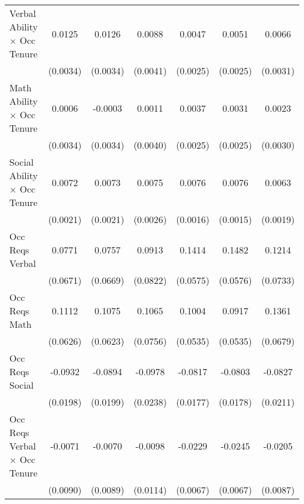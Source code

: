 {\begin{longtable}{l*{6}{c}}
Verbal Ability $\times$ Occ Tenure&      0.0125\sym{***}&      0.0126\sym{***}&      0.0088\sym{**} &      0.0047\sym{*}  &      0.0051\sym{**} &      0.0066\sym{**} \\
                    &    (0.0034)         &    (0.0034)         &    (0.0041)         &    (0.0025)         &    (0.0025)         &    (0.0031)         \\
Math Ability $\times$ Occ Tenure&      0.0006         &     -0.0003         &      0.0011         &      0.0037         &      0.0031         &      0.0023         \\
                    &    (0.0034)         &    (0.0034)         &    (0.0040)         &    (0.0025)         &    (0.0025)         &    (0.0030)         \\
Social Ability $\times$ Occ Tenure&      0.0072\sym{***}&      0.0073\sym{***}&      0.0075\sym{***}&      0.0076\sym{***}&      0.0076\sym{***}&      0.0063\sym{***}\\
                    &    (0.0021)         &    (0.0021)         &    (0.0026)         &    (0.0016)         &    (0.0015)         &    (0.0019)         \\
Occ Reqs Verbal     &      0.0771         &      0.0757         &      0.0913         &      0.1414\sym{**} &      0.1482\sym{**} &      0.1214\sym{*}  \\
                    &    (0.0671)         &    (0.0669)         &    (0.0822)         &    (0.0575)         &    (0.0576)         &    (0.0733)         \\
Occ Reqs Math       &      0.1112\sym{*}  &      0.1075\sym{*}  &      0.1065         &      0.1004\sym{*}  &      0.0917\sym{*}  &      0.1361\sym{**} \\
                    &    (0.0626)         &    (0.0623)         &    (0.0756)         &    (0.0535)         &    (0.0535)         &    (0.0679)         \\
Occ Reqs Social     &     -0.0932\sym{***}&     -0.0894\sym{***}&     -0.0978\sym{***}&     -0.0817\sym{***}&     -0.0803\sym{***}&     -0.0827\sym{***}\\
                    &    (0.0198)         &    (0.0199)         &    (0.0238)         &    (0.0177)         &    (0.0178)         &    (0.0211)         \\
Occ Reqs Verbal $\times$ Occ Tenure&     -0.0071         &     -0.0070         &     -0.0098         &     -0.0229\sym{***}&     -0.0245\sym{***}&     -0.0205\sym{**} \\
                    &    (0.0090)         &    (0.0089)         &    (0.0114)         &    (0.0067)         &    (0.0067)         &    (0.0087)         \\

\end{longtable}}
